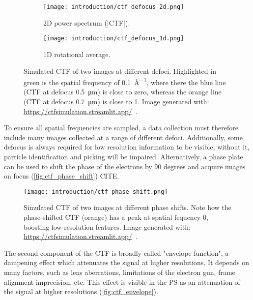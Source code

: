 \begin{figure}[ht]
    \centering
    \begin{subfigure}{.6\textwidth}
        \centering
        \texttt{[image: introduction/ctf\_defocus\_2d.png]}
        \caption{2D power spectrum (|CTF|).}
        \label{fig:ctf_defocus_2d}
    \end{subfigure}%

    \begin{subfigure}{\textwidth}
        \centering
        \texttt{[image: introduction/ctf\_defocus\_1d.png]}
        \caption{1D rotational average.}
        \label{fig:ctf_defocus_1d}
    \end{subfigure}%

    \caption[CTF: effect of defocus]{Simulated CTF of two images at different defoci. Highlighted in green is the spatial frequency of \qty{0.1}{\angstrom^{-1}}, where there the blue line (CTF at defocus \qty{0.5}{\micro\meter}) is close to zero, whereas the orange line (CTF at defocus \qty{0.7}{\micro\meter}) is close to 1. Image generated with: \url{https://ctfsimulation.streamlit.app/}~\cite{jiangWebbasedSimulationContrast2001}.}
    \label{fig:ctf_defocus}
\end{figure}

To ensure all spatial frequencies are sampled, a data collection must therefore include many images collected at a range of different defoci.
Additionally, some defocus is always required for low resolution information to be visible; without it, particle identification and picking will be impaired.
Alternatively, a phase plate can be used to shift the phase of the electrons by 90 degrees and acquire images on focus (\autoref{fig:ctf_phase_shift}) CITE.

\begin{figure}[ht]
    \centering
    \texttt{[image: introduction/ctf\_phase\_shift.png]}
    \caption[CTF: effect of phase shift]{Simulated CTF of two images at different phase shifts. Note how the phase-shifted CTF (orange) has a peak at spatial fequency \num{0}, boosting low-resolution features. Image generated with: \url{https://ctfsimulation.streamlit.app/}~\cite{jiangWebbasedSimulationContrast2001}.}
    \label{fig:ctf_phase_shift}
\end{figure}

The second component of the CTF is broadly called "envelope function", a dampening effect which attenuates the signal at higher resolutions.
It depends on many factors, such as lens aberrations, limitations of the electron gun, frame alignment imprecision, etc.
This effect is visible in the PS as an attenuation of the signal at higher resolutions (\autoref{fig:ctf_envelope}).

